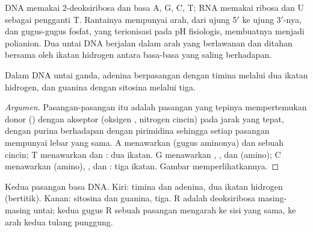 DNA memakai 2-deoksiribosa dan basa A, G, C, T; RNA memakai ribosa dan U
sebagai pengganti T. Rantainya mempunyai arah, dari ujung 5$'$ ke ujung
3$'$-nya, dan gugus-gugus fosfat, yang terionisasi pada pH fisiologis,
membuatnya menjadi polianion. Dua untai DNA berjalan dalam arah yang
berlawanan dan ditahan bersama oleh ikatan hidrogen antara basa-basa yang
saling berhadapan.

\begin{proposition}\label{prop:b2:biomolecules:pairing}
Dalam DNA untai ganda, adenina berpasangan dengan timina melalui dua ikatan
hidrogen, dan guanina dengan sitosina melalui tiga.
\end{proposition}

\begin{proof}[Argumen]
Pasangan-pasangan itu adalah pasangan yang tepinya mempertemukan donor
() dengan akseptor (oksigen , nitrogen cincin) pada jarak
yang tepat, dengan purina berhadapan dengan pirimidina sehingga setiap
pasangan mempunyai lebar yang sama. A menawarkan  (gugus aminonya)
dan sebuah  cincin; T menawarkan  dan : dua ikatan. G
menawarkan , , dan  (amino); C menawarkan 
(amino), , dan : tiga ikatan. Gambar memperlihatkannya.
\end{proof}

\begin{omfigure}
%
\hspace{2.3em}%
\hspace{1.5em}
%
\hspace{2.3em}%
\par\vspace{6pt}

{\small Kedua pasangan basa DNA. Kiri: timina dan adenina, dua ikatan
hidrogen (bertitik). Kanan: sitosina dan guanina, tiga. R adalah deoksiribosa
masing-masing untai; kedua gugus R sebuah pasangan mengarah ke sisi yang
sama, ke arah kedua tulang punggung.}
\end{omfigure}

